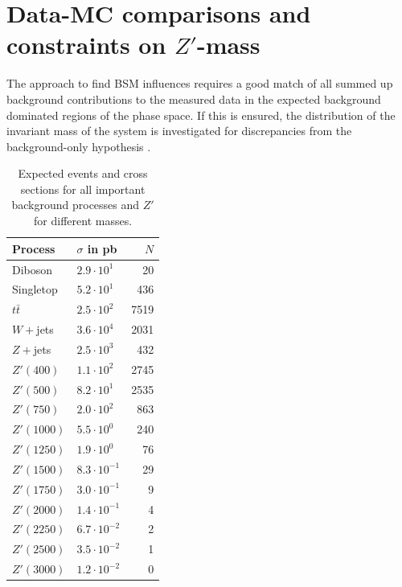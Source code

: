 
\section{Data-MC comparisons and constraints on $Z'$-mass}
The approach to find BSM influences requires a good match of all summed up background contributions to the measured data in the expected background
dominated regions of the phase space. If this is ensured, the distribution of the invariant mass of the system is investigated for discrepancies 
from the background-only hypothesis \cite{anl}. 
\begin{table}[hb]
 \begin{tabular}{l|l|r}
 Process & $\sigma$ in pb & $N$\\
 \hline
Diboson &$2.9\cdot 10^{1}$& 20 \\
Singletop&$5.2\cdot 10^{1}$& 436\\
$t\bar t$&$2.5\cdot 10^{2}$& 7519\\
$W+$jets&$3.6\cdot 10^{4}$& 2031\\
$Z+$jets&$2.5\cdot 10^{3}$& 432\\
\hline
$Z'(400)$&$1.1\cdot 10^{2}$& 2745\\
$Z'(500)$&$8.2\cdot 10^{1}$& 2535\\
$Z'(750)$&$2.0\cdot 10^{2}$& 863\\
$Z'(1000)$&$5.5\cdot 10^{0}$& 240\\
$Z'(1250)$&$1.9\cdot 10^{0}$& 76\\
$Z'(1500)$&$8.3\cdot 10^{-1}$& 29\\
$Z'(1750)$&$3.0\cdot 10^{-1}$& 9\\
$Z'(2000)$&$1.4\cdot 10^{-1}$& 4\\
$Z'(2250)$&$6.7\cdot 10^{-2}$& 2\\
$Z'(2500)$&$3.5\cdot 10^{-2}$& 1\\
$Z'(3000)$&$1.2\cdot 10^{-2}$& 0
 \end{tabular}
 \caption{\small{Expected events and cross sections for all important background processes and $Z'$ for different masses.}}
 \label{tab:expEvents}
\end{table}


